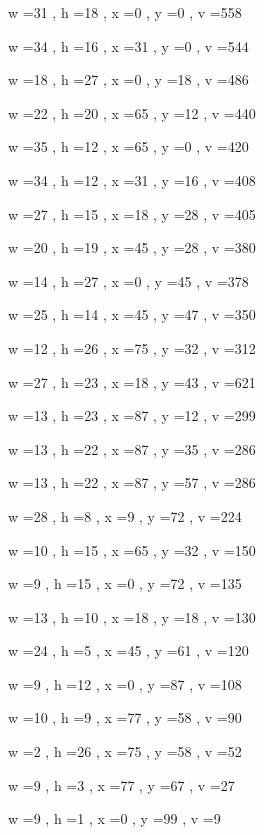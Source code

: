 \documentclass[11pt]{article}
\begin{document}
w =31 , h =18 , x =0 , y =0 , v =558
\par
w =34 , h =16 , x =31 , y =0 , v =544
\par
w =18 , h =27 , x =0 , y =18 , v =486
\par
w =22 , h =20 , x =65 , y =12 , v =440
\par
w =35 , h =12 , x =65 , y =0 , v =420
\par
w =34 , h =12 , x =31 , y =16 , v =408
\par
w =27 , h =15 , x =18 , y =28 , v =405
\par
w =20 , h =19 , x =45 , y =28 , v =380
\par
w =14 , h =27 , x =0 , y =45 , v =378
\par
w =25 , h =14 , x =45 , y =47 , v =350
\par
w =12 , h =26 , x =75 , y =32 , v =312
\par
w =27 , h =23 , x =18 , y =43 , v =621
\par
w =13 , h =23 , x =87 , y =12 , v =299
\par
w =13 , h =22 , x =87 , y =35 , v =286
\par
w =13 , h =22 , x =87 , y =57 , v =286
\par
w =28 , h =8 , x =9 , y =72 , v =224
\par
w =10 , h =15 , x =65 , y =32 , v =150
\par
w =9 , h =15 , x =0 , y =72 , v =135
\par
w =13 , h =10 , x =18 , y =18 , v =130
\par
w =24 , h =5 , x =45 , y =61 , v =120
\par
w =9 , h =12 , x =0 , y =87 , v =108
\par
w =10 , h =9 , x =77 , y =58 , v =90
\par
w =2 , h =26 , x =75 , y =58 , v =52
\par
w =9 , h =3 , x =77 , y =67 , v =27
\par
w =9 , h =1 , x =0 , y =99 , v =9
\par
\newpage
\end{document}
